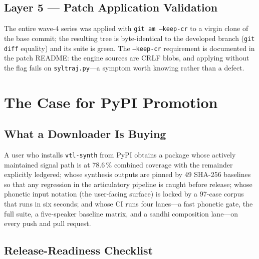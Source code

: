 \documentclass[11pt,a4paper]{article}
\newcommand{\code}[1]{\texttt{#1}}
\newcommand{\pkg}[1]{\texttt{#1}}
\newcommand{\pct}[1]{{#1}\,\%}
\begin{document}
\subsection{Layer 5 --- Patch Application Validation}
The entire wave-4 series was applied with \code{git am --keep-cr} to
a virgin clone of the base commit; the resulting tree is
byte-identical to the developed branch (\code{git diff} equality) and
its suite is green. The \code{--keep-cr} requirement is documented in
the patch README: the engine sources are CRLF blobs, and applying
without the flag fails on \code{syltraj.py}---a symptom worth knowing
rather than a defect.

\section{The Case for PyPI Promotion}
\label{sec:pypi}

\subsection{What a Downloader Is Buying}

A user who installs \pkg{vtl-synth} from PyPI obtains a package
whose actively maintained signal path is at \pct{78.6} combined
coverage with the remainder explicitly ledgered; whose synthesis
outputs are pinned by 49 SHA-256 baselines so that any regression in
the articulatory pipeline is caught before release; whose phonetic
input notation (the user-facing surface) is locked by a 97-case corpus
that runs in six seconds; and whose CI runs four lanes---a fast
phonetic gate, the full suite, a five-speaker baseline matrix, and a
sandhi composition lane---on every push and pull request.

\subsection{Release-Readiness Checklist}
\end{document}
